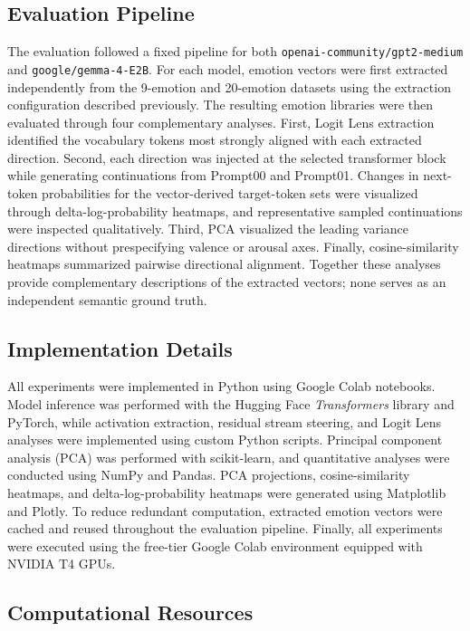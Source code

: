 \subsection{Evaluation Pipeline}

The evaluation followed a fixed pipeline for both \texttt{openai-community/gpt2-medium} and \texttt{google/gemma-4-E2B}. For each
model, emotion vectors were first extracted independently from the 9-emotion and 20-emotion datasets using the extraction 
configuration described previously. The resulting emotion libraries were then evaluated through four complementary analyses. First,
Logit Lens extraction identified the vocabulary tokens most strongly aligned with each extracted direction. Second,
each direction was injected at the selected transformer block while generating continuations from Prompt00 and Prompt01. Changes in
next-token probabilities for the vector-derived target-token sets were visualized through delta-log-probability heatmaps, and representative
sampled continuations were inspected qualitatively. Third, PCA visualized the leading variance directions without prespecifying valence or
arousal axes. Finally, cosine-similarity heatmaps summarized pairwise directional alignment. Together these analyses provide complementary
descriptions of the extracted vectors; none serves as an independent semantic ground truth.

\subsection{Implementation Details}

All experiments were implemented in Python using Google Colab notebooks. Model inference was performed with the Hugging Face
\emph{Transformers} library and PyTorch, while activation extraction, residual stream steering, and Logit Lens analyses were
implemented using custom Python scripts. Principal component analysis (PCA) was performed with scikit-learn, and quantitative
analyses were conducted using NumPy and Pandas. PCA projections, cosine-similarity heatmaps, and delta-log-probability heatmaps
were generated using Matplotlib and Plotly. To reduce redundant computation, extracted emotion vectors
were cached and reused throughout the evaluation pipeline. Finally, all experiments were executed using the free-tier Google Colab
environment equipped with NVIDIA T4 GPUs.

\subsection{Computational Resources}

